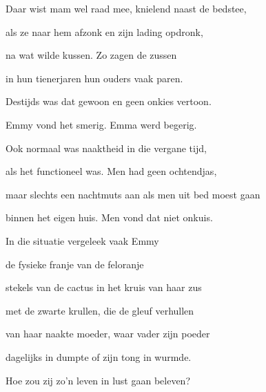 Daar wist mam wel raad mee,
knielend naast de bedstee,

als ze naar hem afzonk
en zijn lading opdronk,

na wat wilde kussen.
Zo zagen de zussen

in hun tienerjaren
hun ouders vaak paren.

Destijds was dat gewoon
en geen onkies vertoon.

Emmy vond het smerig.
Emma werd begerig.

Ook normaal was naaktheid
in die vergane tijd,

als het functioneel was.
Men had geen ochtendjas,

maar slechts een nachtmuts aan
als men uit bed moest gaan

binnen het eigen huis.
Men vond dat niet onkuis.

In die situatie
vergeleek vaak Emmy

de fysieke franje
van de feloranje

stekels van de cactus
in het kruis van haar zus

met de zwarte krullen,
die de gleuf verhullen

van haar naakte moeder,
waar vader zijn poeder

dagelijks in dumpte
of zijn tong in wurmde.

Hoe zou zij zo’n leven
in lust gaan beleven?
